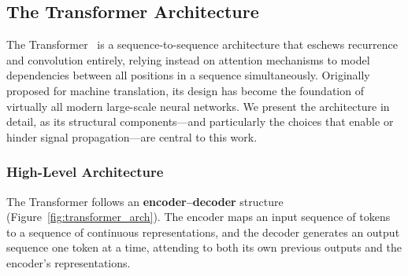 \documentclass[12pt, a4paper]{article}
\begin{document}
\subsection{The Transformer Architecture}

The Transformer~\cite{vaswani2017} is a sequence-to-sequence architecture
that eschews recurrence and convolution entirely, relying instead on
attention mechanisms to model dependencies between all positions in a
sequence simultaneously. Originally proposed for machine translation, its
design has become the foundation of virtually all modern large-scale
neural networks. We present the architecture in detail, as its structural
components---and particularly the choices that enable or hinder signal
propagation---are central to this work.

\subsubsection{High-Level Architecture}

The Transformer follows an \textbf{encoder--decoder} structure
(Figure~\ref{fig:transformer_arch}). The encoder maps an input sequence
of tokens to a sequence of continuous representations, and the decoder
generates an output sequence one token at a time, attending to both its
own previous outputs and the encoder's representations.
\end{document}
